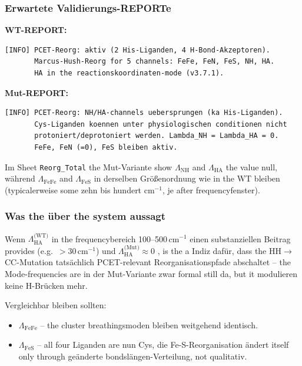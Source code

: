 \documentclass[11pt,a4paper,twoside]{article}
\theoremstyle{remark}
\begin{document}
\subsubsection*{Erwartete Validierungs-REPORTe}

\textbf{WT-REPORT:}

\begin{lstlisting}[style=bash]
[INFO] PCET-Reorg: aktiv (2 His-Liganden, 4 H-Bond-Akzeptoren).
       Marcus-Hush-Reorg for 5 channels: FeFe, FeN, FeS, NH, HA.
       HA in the reactionskoordinaten-mode (v3.7.1).
\end{lstlisting}

\textbf{Mut-REPORT:}

\begin{lstlisting}[style=bash]
[INFO] PCET-Reorg: NH/HA-channels uebersprungen (ka His-Liganden).
       Cys-Liganden koennen unter physiologischen conditionen nicht
       protoniert/deprotoniert werden. Lambda_NH = Lambda_HA = 0.
       FeFe, FeN (=0), FeS bleiben aktiv.
\end{lstlisting}

Im Sheet \texttt{Reorg\_Total} the Mut-Variante show
$\Lambda_\text{NH}$ and $\Lambda_\text{HA}$ the value null, w\"ahrend
$\Lambda_\text{FeFe}$ and $\Lambda_\text{FeS}$ in derselben
Gr\"o{\ss}enordnung wie in the WT bleiben (typicalerweise some zehn bis
hundert cm$^{-1}$, je after frequencyfenster).

\subsubsection*{Was the \"uber the system aussagt}

Wenn $\Lambda_\text{HA}^\text{(WT)}$ in the frequencybereich 100--500\,cm$^{-1}$
einen substanziellen Beitrag provides (e.g.\ $> 30$\,cm$^{-1}$) und
$\Lambda_\text{HA}^\text{(Mut)} \approx 0$ , is the a Indiz
daf\"ur, dass the HH$\to$CC-Mutation tats\"achlich PCET-relevant
Reorganisationspfade abschaltet -- the Mode-frequencies are in der
Mut-Variante zwar formal still da, but it modulieren keine
H-Br\"ucken mehr.

Vergleichbar bleiben sollten:
\begin{itemize}
  \item $\Lambda_\text{FeFe}$ -- the cluster breathingsmoden bleiben
        weitgehend identisch.
  \item $\Lambda_\text{FeS}$ -- all four Liganden are nun Cys, die
        Fe-S-Reorganisation \"andert itself only through ge\"anderte
        bondsl\"angen-Verteilung, not qualitativ.
\end{itemize}
\end{document}

